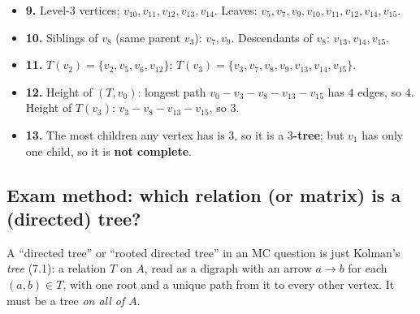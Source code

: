 \documentclass{fkt-notes}
\theoremstyle{definition}
\begin{document}
\begin{example}[7.1 Ex.~9--13]\leavevmode\par\noindent
  \begin{center}
  \end{center}
  \begin{itemize}[nosep]
    \item \textbf{9.} Level-$3$ vertices: $v_{10},v_{11},v_{12},v_{13},v_{14}$.
          Leaves: $v_5,v_7,v_9,v_{10},v_{11},v_{12},v_{14},v_{15}$.
    \item \textbf{10.} Siblings of $v_8$ (same parent $v_3$): $v_7,v_9$.
          Descendants of $v_8$: $v_{13},v_{14},v_{15}$.
    \item \textbf{11.} $T(v_2)=\{v_2,v_5,v_6,v_{12}\}$;
          $T(v_3)=\{v_3,v_7,v_8,v_9,v_{13},v_{14},v_{15}\}$.
    \item \textbf{12.} Height of $(T,v_0)$: longest path
          $v_0-v_3-v_8-v_{13}-v_{15}$ has $4$ edges, so $4$. Height of $T(v_3)$:
          $v_3-v_8-v_{13}-v_{15}$, so $3$.
    \item \textbf{13.} The most children any vertex has is $3$, so it is a
          \textbf{$3$-tree}; but $v_1$ has only one child, so it is
          \textbf{not complete}.
  \end{itemize}
\end{example}

\subsection{Exam method: which relation (or matrix) is a (directed) tree?}
%
A ``directed tree'' or ``rooted directed tree'' in an MC question is just
Kolman's \emph{tree} (7.1): a relation $T$ on $A$, read as a digraph with an
arrow $a\to b$ for each $(a,b)\in T$, with one root and a unique path from it
to every other vertex. It must be a tree \emph{on all of $A$}.
\end{document}
